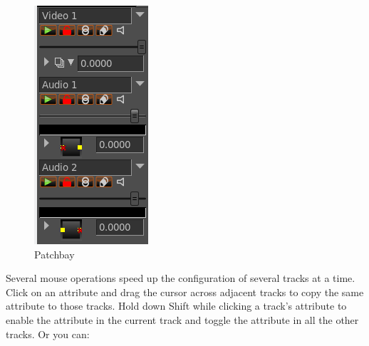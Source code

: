 \begin{figure}
    \vspace{-2ex}
    \centering
    \includegraphics[width=0.79\linewidth]{images/patchbay01.png}
    \caption{Patchbay}
    \label{fig:patchbay01}
\end{figure}


Several mouse operations speed up the configuration of several tracks at a time. Click on an attribute and drag the cursor across adjacent tracks to copy the same attribute to those tracks.  Hold down Shift while clicking a track's attribute to enable the attribute in the current track and toggle the attribute in all the other tracks. Or you can:

